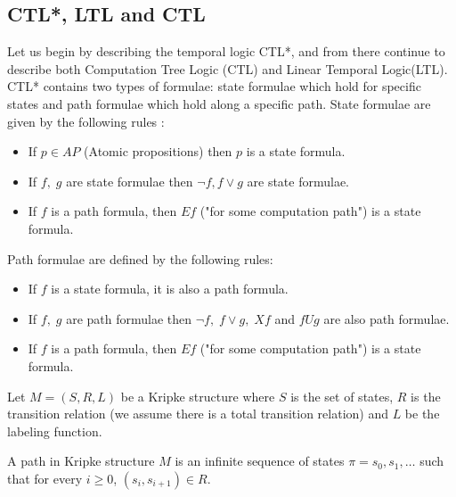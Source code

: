 \documentclass[11pt]{article}
\begin{document}
   \subsection{CTL*, LTL and CTL}
        Let us begin by describing the temporal logic CTL*, and from there continue
        to describe both Computation Tree Logic (CTL) and Linear Temporal Logic(LTL).
        CTL* contains two types of formulae: state formulae which hold for specific
        states and path formulae which hold along a specific path. State formulae
        are given by the following rules \cite{ltl}:
        \begin{itemize}
            \item
                If $p \in AP$ (Atomic propositions) then $p$ is a state formula.

            \item
                If $f,\; g$ are state formulae then $\neg f, f \vee g$ are state formulae.

            \item
                If $f$ is a path formula, then $Ef$ ("for some computation path")
                is a state formula.
        \end{itemize}

        Path formulae are defined by the following rules:
        \begin{itemize}
            \item
                If $f$ is a state formula, it is also a path formula.

            \item
                If $f,\; g$ are path formulae then $\neg f,\; f \vee g, \; Xf$ and 
                $fUg$ are also path formulae.

            \item
                If $f$ is a path formula, then $Ef$ ("for some computation path")
                is a state formula.
        \end{itemize}
        
        Let $M = (S,R,L)$ be a Kripke structure where $S$ is the set of states, $R$
        is the transition relation (we assume there is a total transition relation)
        and $L$ be the labeling function.

        \begin{definition}
            A path in Kripke structure $M$ is an infinite sequence of states 
            $\pi = s_0,s_1,\dots$ such that for every $i\geq 0$, 
            $(s_i, s_{i+1})\in R$.
        \end{definition}
\end{document}

